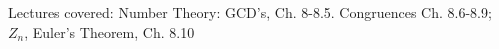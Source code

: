 \documentclass[handout]{mcs}
\begin{document}
\renewcommand{\reading}{Chapter~\bref{number_theory_chap}.\ \emph{Number Theory} through~\bref{Euler_sec}.\ \emph{Euler's Theorem}.}


\begin{staffnotes}
Lectures covered: Number Theory: GCD's, Ch. 8-8.5. Congruences
Ch. 8.6-8.9; $Z_n$, Euler's Theorem, Ch. 8.10
\end{staffnotes}






\end{document}
